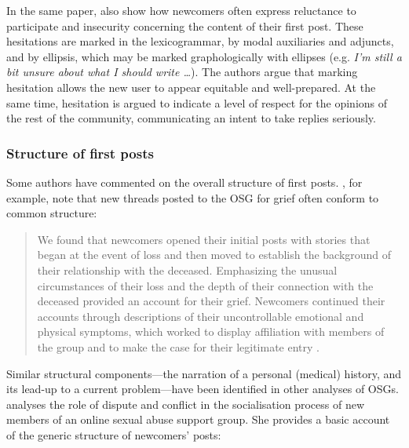 In the same paper, \citeauthor{stommel_use_2011} also show how newcomers often express reluctance to participate and insecurity concerning the content of their first \gls{post}. These hesitations are marked in  the lexicogrammar, by modal auxiliaries and adjuncts, and by ellipsis, which may be marked graphologically with ellipses (e.g. \emph{I'm still a bit unsure about what I should write \dots}). The authors argue that marking hesitation allows the new user to appear equitable and well\hyp{}prepared. At the same time, hesitation is argued to indicate a level of respect for the opinions of the rest of the community, communicating an intent to take replies seriously. 

\subsubsection{Structure of first posts} \label{sect:post-structure}

Some authors have commented on the overall structure of first posts. \textcite{varga2014grieving}, for example, note that new threads posted to the \gls{OSG} for grief often conform to common structure:

\begin{quote}\small\singlespacing
We found that newcomers opened their initial \glspl{post} with stories that began at the event of loss and then moved to establish the background of their relationship with the deceased. Emphasizing the unusual circumstances of their loss and the depth of their connection with the deceased provided an account for their grief. Newcomers continued their accounts through descriptions of their uncontrollable emotional and physical symptoms, which worked to display affiliation with \glspl{member} of the group and to make the case for their legitimate entry \parencite*[p.~5]{varga2014grieving}. 
\end{quote}
%
%
Similar structural components---the narration of a personal (medical) history, and its lead\hyp{}up to a current problem---have been identified in other analyses of \glspl{OSG}. \textcite[p.~4]{weber_missed_2011} analyses the role of dispute and conflict in the socialisation process of new \glspl{member} of an online sexual abuse support group. She provides a basic account of the generic structure of newcomers' \glspl{post}:

